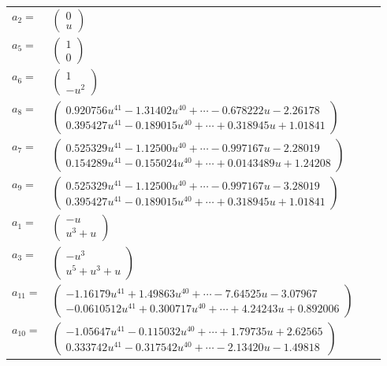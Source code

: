 \documentclass[1p]{elsarticle_modified}
\theoremstyle{definition}
\begin{document}
\begin{tabular}{m{7pt} m{180pt} m{7pt} m{180pt} }
\flushright $a_{2}=$&$\begin{pmatrix}0\\u\end{pmatrix}$ \\
\flushright $a_{5}=$&$\begin{pmatrix}1\\0\end{pmatrix}$ \\
\flushright $a_{6}=$&$\begin{pmatrix}1\\- u^2\end{pmatrix}$ \\
\flushright $a_{8}=$&$\begin{pmatrix}0.920756 u^{41}-1.31402 u^{40}+\cdots-0.678222 u-2.26178\\0.395427 u^{41}-0.189015 u^{40}+\cdots+0.318945 u+1.01841\end{pmatrix}$ \\
\flushright $a_{7}=$&$\begin{pmatrix}0.525329 u^{41}-1.12500 u^{40}+\cdots-0.997167 u-2.28019\\0.154289 u^{41}-0.155024 u^{40}+\cdots+0.0143489 u+1.24208\end{pmatrix}$ \\
\flushright $a_{9}=$&$\begin{pmatrix}0.525329 u^{41}-1.12500 u^{40}+\cdots-0.997167 u-3.28019\\0.395427 u^{41}-0.189015 u^{40}+\cdots+0.318945 u+1.01841\end{pmatrix}$ \\
\flushright $a_{1}=$&$\begin{pmatrix}- u\\u^3+u\end{pmatrix}$ \\
\flushright $a_{3}=$&$\begin{pmatrix}- u^3\\u^5+u^3+u\end{pmatrix}$ \\
\flushright $a_{11}=$&$\begin{pmatrix}-1.16179 u^{41}+1.49863 u^{40}+\cdots-7.64525 u-3.07967\\-0.0610512 u^{41}+0.300717 u^{40}+\cdots+4.24243 u+0.892006\end{pmatrix}$ \\
\flushright $a_{10}=$&$\begin{pmatrix}-1.05647 u^{41}-0.115032 u^{40}+\cdots+1.79735 u+2.62565\\0.333742 u^{41}-0.317542 u^{40}+\cdots-2.13420 u-1.49818\end{pmatrix}$ \\

\end{tabular}
\end{document}
